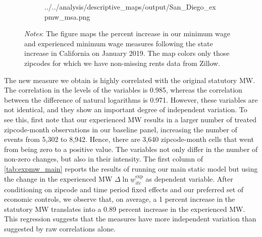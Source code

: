 \begin{figure}
\begin{subfigure}[b]{0.65\textwidth}
		{../../analysis/descriptive_maps/output/San_Diego_expmw_msa.png}
	\end{subfigure}
	\begin{minipage}{0.95\textwidth} \footnotesize
		\vspace{2mm} 
		\textit{Notes}: The figure maps the percent increase in our minimum wage and 
		experienced minimum wage measures following the state increase in California
		on January 2019. The map colors only those zipcodes for which we have 
		non-missing rents data from Zillow.
	\end{minipage}
\end{figure}

The new measure we obtain is highly correlated with the original statutory MW. The 
correlation in the levels of the variables is 0.985, whereas the correlation between the 
difference of natural logarithms is 0.971. %
However, these variables are not identical, and they show an important degree of independent 
variation. To see this, first note that our experienced MW results in a larger number of 
treated zipcode-month observations in our baseline panel, increasing the number of events 
from 5,302 to 8,942. %
Hence, there are 3,640 zipcode-month cells that went from being zero to a positive value. 
The variables not only differ in the number of non-zero changes, but also in their intensity. 
The first column of \autoref{tab:expmw_main} reports the results of running our main static 
model but using the change in the experienced MW $\Delta \ln \underline{w}_{itc}^{\text{exp}}$ 
as dependent variable. After conditioning on zipcode and time period fixed effects
and our preferred set of economic controls, we observe that, on average, a 1 percent increase 
in the statutory MW translates into a 0.89 percent increase in the experienced MW. This 
regression suggests that the measures have more independent variation than suggested by 
raw correlations alone.

